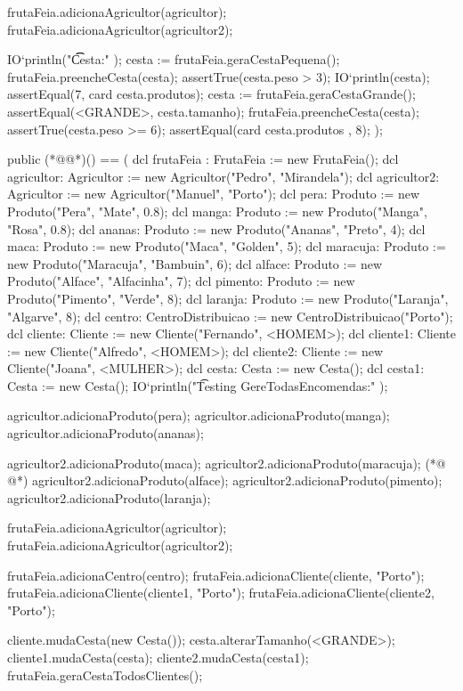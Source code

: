 \begin{vdmpp}[breaklines=true]
 frutaFeia.adicionaAgricultor(agricultor);
 frutaFeia.adicionaAgricultor(agricultor2);
 
 IO`println("\t\t Cesta:" );
 cesta := frutaFeia.geraCestaPequena();
 frutaFeia.preencheCesta(cesta);
 assertTrue(cesta.peso > 3);
 IO`println(cesta); 
 assertEqual(7, card cesta.produtos);
 cesta := frutaFeia.geraCestaGrande();
 assertEqual(<GRANDE>, cesta.tamanho);
 frutaFeia.preencheCesta(cesta);
 assertTrue(cesta.peso >= 6);
 assertEqual(card cesta.produtos , 8);
);

public (*@@*)() == (
 dcl frutaFeia : FrutaFeia := new FrutaFeia(); 
 dcl agricultor: Agricultor := new Agricultor("Pedro", "Mirandela"); 
 dcl agricultor2: Agricultor := new Agricultor("Manuel", "Porto");
 dcl pera: Produto := new Produto("Pera", "Mate", 0.8);
 dcl manga: Produto := new Produto("Manga", "Rosa", 0.8);
 dcl ananas: Produto := new Produto("Ananas", "Preto", 4);
 dcl maca: Produto := new Produto("Maca", "Golden", 5);
 dcl maracuja: Produto := new Produto("Maracuja", "Bambuin", 6);
  dcl alface: Produto := new Produto("Alface", "Alfacinha", 7);
  dcl pimento: Produto := new Produto("Pimento", "Verde", 8);
  dcl laranja: Produto := new Produto("Laranja", "Algarve", 8);  
  dcl centro: CentroDistribuicao := new CentroDistribuicao("Porto");
  dcl cliente: Cliente := new Cliente("Fernando", <HOMEM>);
  dcl cliente1: Cliente := new Cliente("Alfredo", <HOMEM>);
  dcl cliente2: Cliente := new Cliente("Joana", <MULHER>);
  dcl cesta: Cesta := new Cesta(); 
  dcl cesta1: Cesta := new Cesta(); 
 IO`println("\t Testing GereTodasEncomendas:" );  
  
 agricultor.adicionaProduto(pera);
 agricultor.adicionaProduto(manga);
 agricultor.adicionaProduto(ananas);
 
 agricultor2.adicionaProduto(maca);
 agricultor2.adicionaProduto(maracuja);
(*@
\label{testAll:95}
@*)
 agricultor2.adicionaProduto(alface);
 agricultor2.adicionaProduto(pimento);
 agricultor2.adicionaProduto(laranja);
  
 frutaFeia.adicionaAgricultor(agricultor);
 frutaFeia.adicionaAgricultor(agricultor2);
 
 frutaFeia.adicionaCentro(centro);
 frutaFeia.adicionaCliente(cliente, "Porto");
 frutaFeia.adicionaCliente(cliente1, "Porto");
 frutaFeia.adicionaCliente(cliente2, "Porto");
 
 cliente.mudaCesta(new Cesta());
 cesta.alterarTamanho(<GRANDE>);
 cliente1.mudaCesta(cesta);
 cliente2.mudaCesta(cesta1);
 frutaFeia.geraCestaTodosClientes(); 
  

\end{vdmpp}
